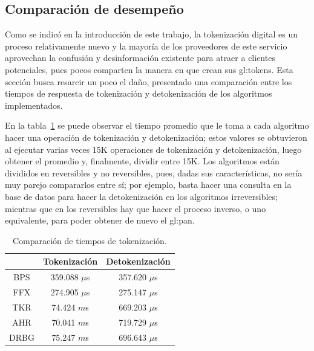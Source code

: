 %
%
%

\subsection{Comparación de desempeño}
\label{sec:comparacion}

Como se indicó en la introducción de este trabajo, la tokenización digital es un
proceso relativamente nuevo y la mayoría de los proveedores de este servicio
aprovechan la confusión y desinformación existente para atraer a clientes
potenciales, pues pocos comparten la manera en que crean sus \glspl{gl:token}.
Esta sección busca resarcir un poco el daño, presentado una comparación entre
los tiempos de respuesta de tokenización y detokenización de los algoritmos
implementados.

En la tabla~\ref{tabla:tiempos_tokenizacion} se puede observar el tiempo
promedio que le toma a cada algoritmo hacer una operación de tokenización
y detokenización; estos valores se obtuvieron al ejecutar varias veces 15K
operaciones de tokenización y detokenización, luego obtener el promedio
y, finalmente, dividir entre 15K. Los algoritmos están divididos en reversibles
y no reversibles, pues, dadas sus características, no sería muy parejo
compararlos entre sí; por ejemplo, basta hacer una consulta en la base de datos
para hacer la detokenización en los algoritmos irreversibles; mientras que en
los reversibles hay que hacer el proceso inverso, o uno equivalente, para
poder obtener de nuevo el \gls{gl:pan}.

\begin{table}
  \begin{center}
    \begin{tabular}{c|c|c|}
      \cline{2-3}
      & Tokenización & Detokenización \\
      \hline
      \multicolumn{1}{|c|}{BPS}
        & 359.088   $\mu$s & 357.620 $\mu$s   \\\hline
      \multicolumn{1}{|c|}{FFX}
        & 274.905   $\mu$s & 275.147 $\mu$s   \\\hline

      \multicolumn{1}{|c|}{TKR}
        & 74.424  $m$s & 669.203 $\mu$s   \\\hline
      \multicolumn{1}{|c|}{AHR}
        & 70.041  $m$s & 719.729 $\mu$s   \\\hline
      \multicolumn{1}{|c|}{DRBG}
        & 75.247  $m$s & 696.643 $\mu$s  \\\hline
    \end{tabular}

    \caption{Comparación de tiempos de tokenización.}
    \label{tabla:tiempos_tokenizacion}
  \end{center}
\end{table}

